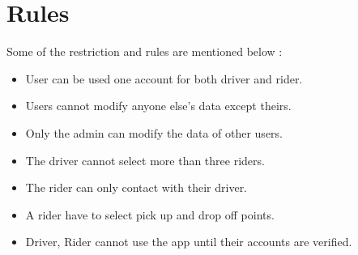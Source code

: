 \section{Rules}
Some of the restriction and rules are mentioned below :
\begin{itemize}
\item User can be used one account for both driver and rider.
\item Users cannot modify anyone else’s data except theirs.
\item Only the admin can modify the data of other users.
\item The driver cannot select more than three riders.
\item The rider can only contact with their driver.
\item A rider have to select pick up and drop off points.
\item Driver, Rider cannot use the app until their accounts are verified.
\end{itemize}


 


 






